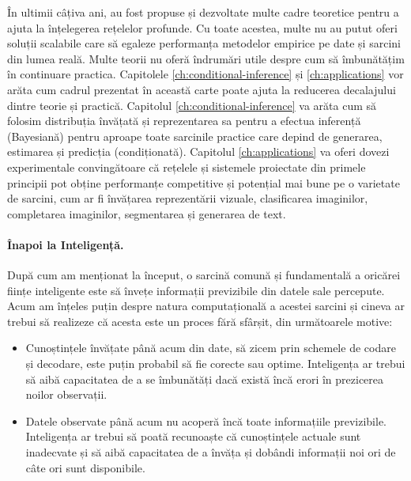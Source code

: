 \documentclass[../../book-main_ro.tex]{subfiles}
\begin{document}
În ultimii câțiva ani, au fost propuse și dezvoltate multe cadre teoretice pentru a ajuta la înțelegerea rețelelor profunde. Cu toate acestea, multe nu au putut oferi soluții scalabile care să egaleze performanța metodelor empirice pe date și sarcini din lumea reală. Multe teorii nu oferă îndrumări utile despre cum să îmbunătățim în continuare practica. Capitolele \ref{ch:conditional-inference} și \ref{ch:applications} vor arăta cum cadrul prezentat în această carte poate ajuta la reducerea decalajului dintre teorie și practică. Capitolul \ref{ch:conditional-inference} va arăta cum să folosim distribuția învățată și reprezentarea sa pentru a efectua inferență (Bayesiană) pentru aproape toate sarcinile practice care depind de generarea, estimarea și predicția (condiționată). Capitolul \ref{ch:applications} va oferi dovezi experimentale convingătoare că rețelele și sistemele proiectate din primele principii pot obține performanțe competitive și potențial mai bune pe o varietate de sarcini, cum ar fi învățarea reprezentării vizuale, clasificarea imaginilor, completarea imaginilor, segmentarea și generarea de text.


\paragraph{Înapoi la Inteligență.}
După cum am menționat la început, o sarcină comună și fundamentală a oricărei ființe inteligente este să învețe informații previzibile din datele sale percepute. Acum am înțeles puțin despre natura computațională a acestei sarcini și cineva ar trebui să realizeze că acesta este un proces fără sfârșit, din următoarele motive:
\begin{itemize}
    \item Cunoștințele învățate până acum din date, să zicem prin schemele de codare și decodare, este puțin probabil să fie corecte sau optime. Inteligența ar trebui să aibă capacitatea de a se îmbunătăți dacă există încă erori în prezicerea noilor observații.
    \item Datele observate până acum nu acoperă încă toate informațiile previzibile. Inteligența ar trebui să poată recunoaște că cunoștințele actuale sunt inadecvate și să aibă capacitatea de a învăța și dobândi informații noi ori de câte ori sunt disponibile.
\end{itemize}
\end{document}
